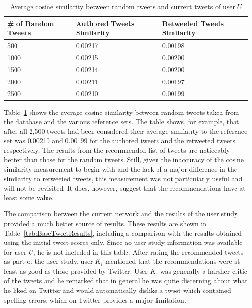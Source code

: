 \begin{table}
\centering
\begin{tabular}{p{3.25cm}|p{4cm}|p{4cm}}
{\bf \# of Random Tweets} & {\bf Authored Tweets Similarity} & {\bf Retweeted Tweets Similarity} \\ \hline
 500 & 0.00217 & 0.00198 \\ \hline
1000 & 0.00215  & 0.00200 \\ \hline
1500 & 0.00214 & 0.00200 \\ \hline
2000 & 0.00211 & 0.00197 \\ \hline
2500 & 0.00210 & 0.00199 \\
\end{tabular}
\caption{Average cosine similarity between random tweets and current tweets of user $U$}
\label{tab:RandomTweetSimilarity}
\end{table}


Table~\ref{tab:RandomTweetSimilarity} shows the average cosine similarity between random tweets taken from the database and the various reference sets. The table shows, for example, that after all 2,500 tweets had been considered their average similarity to the reference set was 0.00210 and 0.00199 for the authored tweets and the retweeted tweets, respectively. The results from the recommended list of tweets are noticeably better than those for the random tweets. Still, given the inaccuracy of the cosine similarity measurement to begin with and the lack of a major difference in the similarity to retweeted tweets, this measurement was not particularly useful and will not be revisited. It does, however, suggest that the recommendations have at least some value.

The comparison between the current network and the results of the user study provided a much better source of results. These results are shown in Table~\ref{tab:BaseTweetResults}, including a comparison with the results obtained using the initial tweet scores only. Since no user study information was available for user $U$, he is not included in this table. After rating the recommended tweets as part of the user study, user $K_{i}$ mentioned that the recommendations were at least as good as those provided by Twitter. User $K_{j}$ was generally a harsher critic of the tweets and he remarked that in general he was quite discerning about what he liked on Twitter and would automatically dislike a tweet which contained spelling errors, which on Twitter provides a major limitation.


